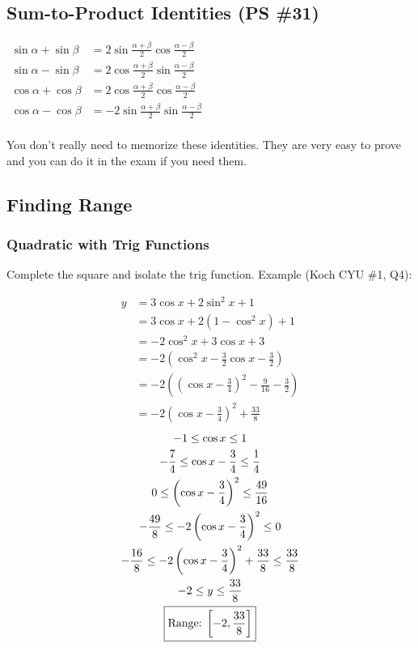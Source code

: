 \documentclass{article}
\begin{document}
\subsection{Sum-to-Product Identities (PS \#31)}
\begin{center}
\hyperref[proof:s2p]{
	$\begin{aligned}
		\sin\alpha+\sin\beta&=
		2\sin\frac{\alpha+\beta}{2}\cos\frac{\alpha-\beta}{2} \\
		\sin\alpha-\sin\beta&=
		2\cos\frac{\alpha+\beta}{2}\sin\frac{\alpha-\beta}{2} \\
		\cos\alpha+\cos\beta&=
		2\cos\frac{\alpha+\beta}{2}\cos\frac{\alpha-\beta}{2} \\
		\cos\alpha-\cos\beta&=
		-2\sin\frac{\alpha+\beta}{2}\sin\frac{\alpha-\beta}{2} \\
	\end{aligned}$
}
\end{center}

You don't really need to memorize these identities. They are
very easy to prove and you can do it in the exam if you need them.

\newpage

\subsection{Finding Range}
\subsubsection{Quadratic with Trig Functions}
Complete the square and isolate the trig function. Example (Koch CYU \#1, Q4):
\begin{multicols}{2}
	\begin{align*}
		y&=3\cos x+2\sin^2x+1 \\
		&=3\cos x+2\left(1-\cos^2x\right)+1 \\
		&=-2\cos^2x+3\cos x+3 \\
		&=-2\left(\cos^2x-\frac{3}{2}\cos x-\frac{3}{2}\right) \\
		&=-2\left(\left(\cos x-\frac{3}{4}\right)^2-\frac{9}{16}-\frac{3}{2}\right) \\
		&=-2\left(\cos x-\frac{3}{4}\right)^2+\frac{33}{8}
	\end{align*}
	\begin{gather*}
		-1\leq\cos x\leq1 \\
		-\frac{7}{4}\leq\cos x-\frac{3}{4}\leq\frac{1}{4} \\
		0\leq\left(\cos x-\frac{3}{4}\right)^2\leq\frac{49}{16} \\
		-\frac{49}{8}\leq-2\left(\cos x-\frac{3}{4}\right)^2\leq0 \\
		-\frac{16}{8}\leq-2\left(\cos x-\frac{3}{4}\right)^2+\frac{33}{8}\leq\frac{33}{8} \\
		-2\leq y\leq\frac{33}{8} \\
		\boxed{\text{Range: $\interval[scaled]{-2}{\frac{33}{8}}$}}
	\end{gather*}
\end{multicols}
\end{document}
